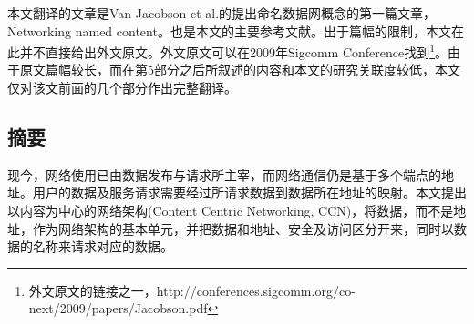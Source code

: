 % 
%
%
% 
%

\par
本文翻译的文章是Van Jacobson et al.的提出命名数据网概念的第一篇文章，Networking named content。也是本文的主要参考文献。出于篇幅的限制，本文在此并不直接给出外文原文。外文原文可以在2009年Sigcomm Conference找到\footnote{外文原文的链接之一，http://conferences.sigcomm.org/co-next/2009/papers/Jacobson.pdf}。由于原文篇幅较长，而在第5部分之后所叙述的内容和本文的研究关联度较低，本文仅对该文前面的几个部分作出完整翻译。
\subsection{摘要}
\par
现今，网络使用已由数据发布与请求所主宰，而网络通信仍是基于多个端点的地址。用户的数据及服务请求需要经过所请求数据到数据所在地址的映射。本文提出以内容为中心的网络架构(Content Centric Networking, CCN)，将数据，而不是地址，作为网络架构的基本单元，并把数据和地址、安全及访问区分开来，同时以数据的名称来请求对应的数据。
\par
